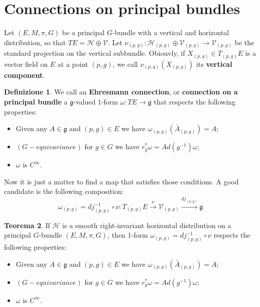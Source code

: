 \documentclass[12pt,a4paper]{report}
\theoremstyle{definition}
\newtheorem{Def}{Definizione}[chapter]
\theoremstyle{Theorem}
\newtheorem{Theo}[Def]{Teorema}
\theoremstyle{definition}
\theoremstyle{definition}
\theoremstyle{definition}
\begin{document}
	\section{Connections on principal bundles}
		Let $(E,M,\pi,G)$ be a principal $G$-bundle with a vertical and horizontal distribution, so that $TE=\mathcal{H}\oplus\mathcal{V}$. Let $\nu_{(p,g)}:\mathcal{H}_{(p,g)}\oplus\mathcal{V}_{(p,g)}\rightarrow \mathcal{V}_{(p,g)}$ be the standard projection on the vertical subbundle. Obiouvly, if $X_{(p,g)}\in T_{(p,g)}E$ is a vector field on $E$ at a point $(p,g)$, we call $\nu_{(p,g)}(X_{(p,g)})$ its \textbf{vertical component}.
		\begin{Def}\label{Def_6.6}
			We call an \textbf{Ehresmann connection}, or \textbf{connection on a principal bundle} a $\mathfrak{g}$-valued 1-form $\omega:TE\rightarrow \mathfrak{g}$ that respects the following properties:
			\begin{itemize}
				\item Given any $A\in\mathfrak{g}$ and $(p,g)\in E$ we have $\omega_{(p,g)}(\bar{A}_{(p,g)})=A$;
				\item $(G-equivariance)$ for $g\in G$ we have $r^*_g\omega=Ad(g^{-1})\omega$;
				\item $\omega$ is $C^\infty$.
			\end{itemize}
		\end{Def}
		Now it is just a matter to find a map that satisfies those conditions. A good candidate is the following composition:
		$$\omega_{(p,g)}=dj_{(p,g)}^{-1}\circ \nu:T_{(p,g)}E\xrightarrow{\nu} \mathcal{V}_{(p,g)}\xrightarrow{dj_{(p,g)}}\mathfrak{g}$$
		\begin{Theo}
			If $\mathcal{H}$ is a smooth right-invariant horizontal distribution on a principal $G$-bundle $(E,M,\pi,G)$, then 1-form $\omega_{(p,g)}=dj_{(p,g)}^{-1}\circ \nu$ respects the following properties:
				\begin{itemize}
				\item Given any $A\in\mathfrak{g}$ and $(p,g)\in E$ we have $\omega_{(p,g)}(\bar{A}_{(p,g)})=A$;
				\item $(G-equivariance)$ for $g\in G$ we have $r^*_g\omega=Ad(g^{-1})\omega$;
				\item $\omega$ is $C^\infty$.
			\end{itemize}
		\end{Theo}
\end{document}
